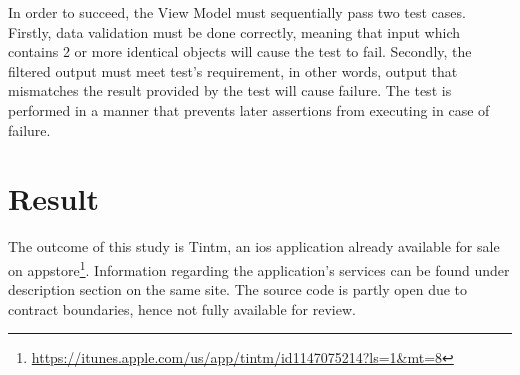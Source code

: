 \documentclass[11pt,a4paper,oneside,article]{memoir}
\begin{document}
In order to succeed, the View Model must sequentially pass two test cases. Firstly, data validation must be done correctly, meaning that input which contains 2 or more identical objects will cause the test to fail. Secondly, the filtered output must meet test's requirement, in other words, output that mismatches the result provided by the test will cause failure. The test is performed in a manner that prevents later assertions from executing in case of failure.

\newpage
\chapter{Result}
The outcome of this study is Tintm, an \gls{ios} application already available for sale on \gls{appstore}\footnote{\url{https://itunes.apple.com/us/app/tintm/id1147075214?ls=1&mt=8}}. Information regarding the application's services can be found under description section on the same site. The source code is partly open due to contract boundaries, hence not fully available for review. 
\end{document}
